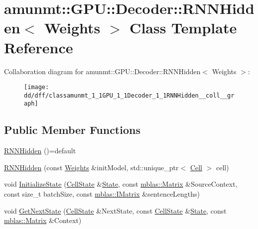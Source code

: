 \hypertarget{classamunmt_1_1GPU_1_1Decoder_1_1RNNHidden}{}\section{amunmt\+:\+:G\+PU\+:\+:Decoder\+:\+:R\+N\+N\+Hidden$<$ Weights $>$ Class Template Reference}
\label{classamunmt_1_1GPU_1_1Decoder_1_1RNNHidden}


Collaboration diagram for amunmt\+:\+:G\+PU\+:\+:Decoder\+:\+:R\+N\+N\+Hidden$<$ Weights $>$\+:
\nopagebreak
\begin{figure}[H]
\begin{center}
\leavevmode
\texttt{[image: dd/dff/classamunmt\_1\_1GPU\_1\_1Decoder\_1\_1RNNHidden\_\_coll\_\_graph]}
\end{center}
\end{figure}
\subsection*{Public Member Functions}
\begin{DoxyCompactItemize}
\item 
\hyperlink{classamunmt_1_1GPU_1_1Decoder_1_1RNNHidden_a50a8e946df49d61acc5061c4f169cdfa}{R\+N\+N\+Hidden} ()=default
\item 
\hyperlink{classamunmt_1_1GPU_1_1Decoder_1_1RNNHidden_a42705cd0728dbd79b755908f480b4824}{R\+N\+N\+Hidden} (const \hyperlink{structamunmt_1_1GPU_1_1Weights}{Weights} \&init\+Model, std\+::unique\+\_\+ptr$<$ \hyperlink{classamunmt_1_1GPU_1_1Cell}{Cell} $>$ cell)
\item 
void \hyperlink{classamunmt_1_1GPU_1_1Decoder_1_1RNNHidden_a4e603e53eb86acbacce1a348e2be20f4}{Initialize\+State} (\hyperlink{structamunmt_1_1GPU_1_1CellState}{Cell\+State} \&\hyperlink{classamunmt_1_1State}{State}, const \hyperlink{namespaceamunmt_1_1GPU_1_1mblas_ab67821a8254de53e45a623cf73c0aef6}{mblas\+::\+Matrix} \&Source\+Context, const size\+\_\+t batch\+Size, const \hyperlink{namespaceamunmt_1_1GPU_1_1mblas_ad6a337d269d1833a6028b8871e57d2d0}{mblas\+::\+I\+Matrix} \&sentence\+Lengths)
\item 
void \hyperlink{classamunmt_1_1GPU_1_1Decoder_1_1RNNHidden_a88bef032a7281492b4045e78ec2a7c3d}{Get\+Next\+State} (\hyperlink{structamunmt_1_1GPU_1_1CellState}{Cell\+State} \&Next\+State, const \hyperlink{structamunmt_1_1GPU_1_1CellState}{Cell\+State} \&\hyperlink{classamunmt_1_1State}{State}, const \hyperlink{namespaceamunmt_1_1GPU_1_1mblas_ab67821a8254de53e45a623cf73c0aef6}{mblas\+::\+Matrix} \&Context)
\end{DoxyCompactItemize}
